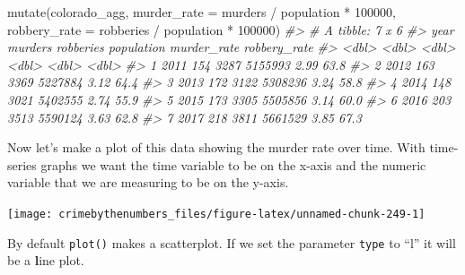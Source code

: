 \documentclass[
]{krantz}
\makeatletter
\newenvironment{Shaded}{\begin{snugshade}}{\end{snugshade}}
\newcommand{\AttributeTok}[1]{\textcolor[rgb]{0.61,0.61,0.61}{#1}}
\newcommand{\CommentTok}[1]{\textcolor[rgb]{0.37,0.37,0.37}{\textit{#1}}}
\newcommand{\DecValTok}[1]{\textcolor[rgb]{0.06,0.06,0.06}{#1}}
\newcommand{\FunctionTok}[1]{\textcolor[rgb]{0,0,0}{#1}}
\newcommand{\NormalTok}[1]{#1}
\newcommand{\SpecialCharTok}[1]{\textcolor[rgb]{0,0,0}{#1}}
\newenvironment{kframe}{%
\medskip{}
\setlength{\fboxsep}{.8em}
 \def\at@end@of@kframe{}%
 \ifinner\ifhmode%
  \def\at@end@of@kframe{\end{minipage}}%
  \begin{minipage}{\columnwidth}%
 \fi\fi%
 \def\FrameCommand##1{\hskip\@totalleftmargin \hskip-\fboxsep
 \colorbox{shadecolor}{##1}\hskip-\fboxsep
     \hskip-\linewidth \hskip-\@totalleftmargin \hskip\columnwidth}%
 \MakeFramed {\advance\hsize-\width
   \@totalleftmargin\z@ \linewidth\hsize
   \@setminipage}}%
 {\par\unskip\endMakeFramed%
 \at@end@of@kframe}
\renewenvironment{Shaded}{\begin{kframe}}{\end{kframe}}
\makeatother
\begin{document}
\begin{Shaded}
\begin{Highlighting}[]
\FunctionTok{mutate}\NormalTok{(colorado\_agg,}
       \AttributeTok{murder\_rate  =}\NormalTok{ murders }\SpecialCharTok{/}\NormalTok{ population }\SpecialCharTok{*} \DecValTok{100000}\NormalTok{,}
       \AttributeTok{robbery\_rate =}\NormalTok{ robberies }\SpecialCharTok{/}\NormalTok{ population }\SpecialCharTok{*} \DecValTok{100000}\NormalTok{)}
\CommentTok{\#\textgreater{} \# A tibble: 7 x 6}
\CommentTok{\#\textgreater{}    year murders robberies population murder\_rate robbery\_rate}
\CommentTok{\#\textgreater{}   \textless{}dbl\textgreater{}   \textless{}dbl\textgreater{}     \textless{}dbl\textgreater{}      \textless{}dbl\textgreater{}       \textless{}dbl\textgreater{}        \textless{}dbl\textgreater{}}
\CommentTok{\#\textgreater{} 1  2011     154      3287    5155993        2.99         63.8}
\CommentTok{\#\textgreater{} 2  2012     163      3369    5227884        3.12         64.4}
\CommentTok{\#\textgreater{} 3  2013     172      3122    5308236        3.24         58.8}
\CommentTok{\#\textgreater{} 4  2014     148      3021    5402555        2.74         55.9}
\CommentTok{\#\textgreater{} 5  2015     173      3305    5505856        3.14         60.0}
\CommentTok{\#\textgreater{} 6  2016     203      3513    5590124        3.63         62.8}
\CommentTok{\#\textgreater{} 7  2017     218      3811    5661529        3.85         67.3}
\end{Highlighting}
\end{Shaded}

Now let's make a plot of this data showing the murder rate over time. With time-series graphs we want the time variable to be on the x-axis and the numeric variable that we are measuring to be on the y-axis.

\begin{Shaded}
\end{Shaded}

\begin{center}\texttt{[image: crimebythenumbers\_files/figure-latex/unnamed-chunk-249-1]} \end{center}

By default \texttt{plot()} makes a scatterplot. If we set the parameter \texttt{type} to ``l'' it will be a \textbf{l}ine plot.
\end{document}

